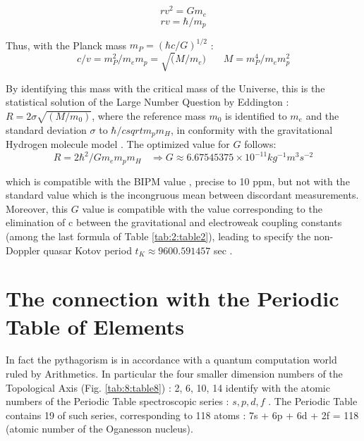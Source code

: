 \documentclass[a4paper,9pt]{article}
\begin{document}
\begin{equation}
  r v^2 = Gm_e
  \end{equation}
  \begin{equation}
r v = \hbar/m_p  
\end{equation}

Thus, with the Planck mass $m_P = (\hbar c/G)^{1/2}$ : 
\begin{equation}
c/v = m_P^2/m_em_p = \sqrt(M/m_e)~~~~~~~~   M = m_P^4/m_em_p^2
\end{equation}

By identifying this mass with the critical mass of the Universe, this is the statistical solution \cite{Durham} of the Large Number Question by Eddington  : $R = 2 \sigma \sqrt{(M/m_0)}$, where the reference mass $m_0$ is identified to $m_e$ and the standard deviation $\sigma$ to $\hbar/csqrt{m_pm_H}$, in conformity with the gravitational Hydrogen molecule model \cite{Sanchez}. The optimized value for $G$ follows:
\begin{equation}
R = 2\hbar^2/Gm_em_pm_H  ~~~~  \Rightarrow G \approx 6.67545375 \times 10^{-11}  kg^{-1}m^{3}s^{-2}    
\end{equation}

which is compatible with the BIPM value \cite{Quinn}, precise to 10 ppm, but not with the standard value \cite{Tannabashi} which is the incongruous mean between discordant measurements. Moreover, this $G$ value is compatible with the value corresponding to the elimination of c between the gravitational and electroweak coupling constants (among the last formula of Table \ref{tab:2:table2}), leading to specify the non-Doppler quasar Kotov period $t_K \approx 9600.591457$ sec \cite{Sanchez}.







\section{The connection with the Periodic Table of Elements}

     In fact the pythagorism is in accordance with a quantum computation world ruled by Arithmetics. In particular the four smaller dimension numbers of the Topological Axis (Fig. \ref{tab:8:table8}) : 2, 6, 10, 14 identify with the atomic numbers of the Periodic Table spectroscopic series : $s, p, d, f$ . The Periodic Table contains 19 of such series, corresponding to 118 atoms : 7s + 6p + 6d + 2f = 118 (atomic number of the Oganesson nucleus). 
     
\end{document}
